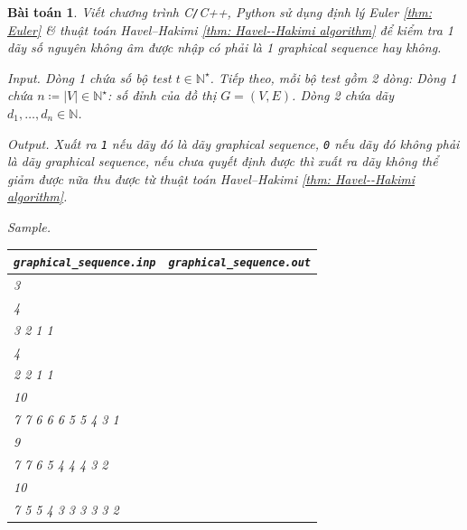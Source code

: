 \documentclass[oneside]{book}
\newtheorem{baitoan}{Bài toán}
\begin{document}
\begin{baitoan}
	Viết chương trình {\sf C{\tt/}C++, Python} sử dụng định lý Euler \ref{thm: Euler} \& thuật toán Havel--Hakimi \ref{thm: Havel--Hakimi algorithm} để kiểm tra 1 dãy số nguyên không âm được nhập có phải là 1 graphical sequence hay không.
	\item {\sf Input.} Dòng 1 chứa số bộ test $t\in\mathbb{N}^\star$. Tiếp theo, mỗi bộ test gồm 2 dòng: Dòng 1 chứa $n\coloneqq|V|\in\mathbb{N}^\star$: số đỉnh của đồ thị $G = (V,E)$. Dòng 2 chứa dãy $d_1,\ldots,d_n\in \mathbb{N}$.
	\item {\sf Output.} Xuất ra {\tt1} nếu dãy đó là dãy graphical sequence, {\tt0} nếu dãy đó không phải là dãy graphical sequence, nếu chưa quyết định được thì xuất ra dãy không thể giảm được nữa thu được từ thuật toán Havel--Hakimi \ref{thm: Havel--Hakimi algorithm}.
	\item {\sf Sample.}
	\begin{table}[H]
		\centering
		\begin{tabular}{|l|l|}
			\hline
			\verb|graphical_sequence.inp| & \verb|graphical_sequence.out| \\
			\hline
			3 &  \\
			4 &  \\
			3 2 1 1 & \\
			4 &  \\
			2 2 1 1 &  \\
			10 &  \\
			7 7 6 6 6 5 5 4 3 1 &  \\
			9 &  \\
			7 7 6 5 4 4 4 3 2 &  \\
			10 &  \\
			7 5 5 4 3 3 3 3 3 2 &  \\
			\hline
		\end{tabular}
	\end{table}
\end{baitoan}
\end{document}
